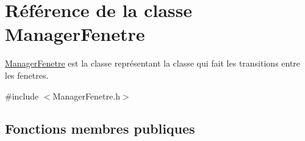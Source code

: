 \hypertarget{classManagerFenetre}{\section{\-Référence de la classe \-Manager\-Fenetre}
\label{classManagerFenetre}
}


\hyperlink{classManagerFenetre}{\-Manager\-Fenetre} est la classe représentant la classe qui fait les transitions entre les fenetres.  




{\ttfamily \#include $<$\-Manager\-Fenetre.\-h$>$}

\subsection*{\-Fonctions membres publiques}
